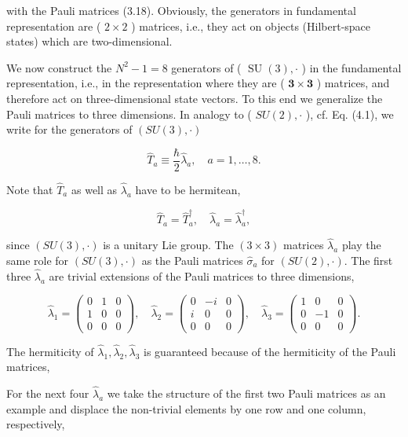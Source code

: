 \documentclass[10pt, letterpaper]{article}
\begin{document}
with the Pauli matrices (3.18). Obviously, the generators in fundamental representation are ( $2 \times 2$ ) matrices, i.e., they act on objects (Hilbert-space states) which are two-dimensional.

We now construct the $N^{2}-1=8$ generators of ( $\operatorname{SU}(3), \cdot$ ) in the fundamental representation, i.e., in the representation where they are ( $\mathbf{3} \times \mathbf{3}$ ) matrices, and therefore act on three-dimensional state vectors. To this end we generalize the Pauli matrices to three dimensions. In analogy to ( $S U(2), \cdot$ ), cf. Eq. (4.1), we write for the generators of $(S U(3), \cdot)$

$$
\hat{T}_{a} \equiv \frac{\hbar}{2} \hat{\lambda}_{a}, \quad a=1, \ldots, 8 .
$$

Note that $\hat{T}_{a}$ as well as $\hat{\lambda}_{a}$ have to be hermitean,

$$
\hat{T}_{a}=\hat{T}_{a}^{\dagger}, \quad \hat{\lambda}_{a}=\hat{\lambda}_{a}^{\dagger},
$$

since $(S U(3), \cdot)$ is a unitary Lie group. The $(3 \times 3)$ matrices $\hat{\lambda}_{a}$ play the same role for $(S U(3), \cdot)$ as the Pauli matrices $\hat{\sigma}_{a}$ for $(S U(2), \cdot)$. The first three $\hat{\lambda}_{a}$ are trivial extensions of the Pauli matrices to three dimensions,

$$
\hat{\lambda}_{1}=\left(\begin{array}{lll}
0 & 1 & 0 \\
1 & 0 & 0 \\
0 & 0 & 0
\end{array}\right), \quad \hat{\lambda}_{2}=\left(\begin{array}{ccc}
0 & -i & 0 \\
i & 0 & 0 \\
0 & 0 & 0
\end{array}\right), \quad \hat{\lambda}_{3}=\left(\begin{array}{ccc}
1 & 0 & 0 \\
0 & -1 & 0 \\
0 & 0 & 0
\end{array}\right) .
$$

The hermiticity of $\hat{\lambda}_{1}, \hat{\lambda}_{2}, \hat{\lambda}_{3}$ is guaranteed because of the hermiticity of the Pauli matrices,

For the next four $\hat{\lambda}_{a}$ we take the structure of the first two Pauli matrices as an example and displace the non-trivial elements by one row and one column, respectively,
\end{document}
